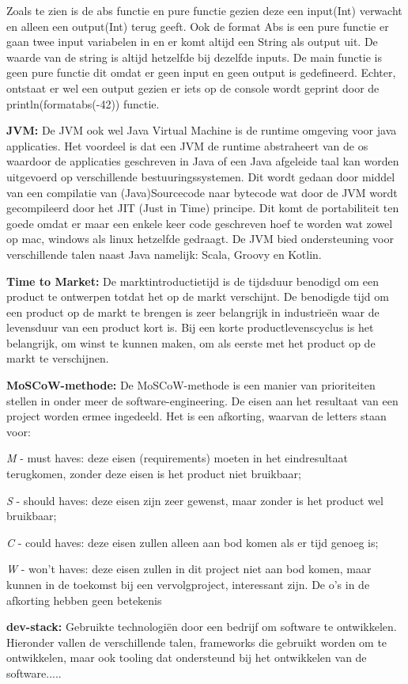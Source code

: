 Zoals te zien is de abs functie en pure functie gezien deze een input(Int) verwacht en alleen een output(Int) terug geeft.
Ook de format Abs is een pure functie er gaan twee input variabelen in en er komt altijd een String als output uit.
De waarde van de string is altijd hetzelfde bij dezelfde inputs.
De main functie is geen pure functie dit omdat er geen input en geen output is gedefineerd.
Echter, ontstaat er wel een output gezien er iets op de console wordt geprint door de println(formatabs(-42)) functie.
\smallskip

\textbf{JVM: }
De JVM ook wel Java Virtual Machine is de runtime omgeving voor java applicaties.
Het voordeel is dat een JVM de runtime abstraheert van de os waardoor de applicaties geschreven in Java of een Java afgeleide taal kan worden uitgevoerd op verschillende bestuuringssystemen.
Dit wordt gedaan door middel van een compilatie van (Java)Sourcecode naar bytecode wat door de JVM wordt gecompileerd door het JIT (Just in Time) principe.
Dit komt de portabiliteit ten goede omdat er maar een enkele keer code geschreven hoef te worden wat zowel op mac, windows als linux hetzelfde gedraagt.
De JVM bied ondersteuning voor verschillende talen naast Java namelijk: Scala, Groovy en Kotlin.
\smallskip

\textbf{Time to Market: }
De marktintroductietijd is de tijdsduur benodigd om een product te ontwerpen totdat het op de markt verschijnt.
De benodigde tijd om een product op de markt te brengen is zeer belangrijk in industrieën waar de levensduur van een product kort is.
Bij een korte productlevenscyclus is het belangrijk, om winst te kunnen maken, om als eerste met het product op de markt te verschijnen.
\smallskip

\textbf{MoSCoW-methode: }
De MoSCoW-methode is een manier van prioriteiten stellen in onder meer de software-engineering.
De eisen aan het resultaat van een project worden ermee ingedeeld.
Het is een afkorting, waarvan de letters staan voor:

\textit{M} - must haves: deze eisen (requirements) moeten in het eindresultaat terugkomen, zonder deze eisen is het product niet bruikbaar;

\textit{S} - should haves: deze eisen zijn zeer gewenst, maar zonder is het product wel bruikbaar;

\textit{C} - could haves: deze eisen zullen alleen aan bod komen als er tijd genoeg is;

\textit{W} - won't haves: deze eisen zullen in dit project niet aan bod komen, maar kunnen in de toekomst bij een vervolgproject, interessant zijn.
De o's in de afkorting hebben geen betekenis
\smallskip

\textbf{dev-stack: }
Gebruikte technologiën door een bedrijf om software te ontwikkelen.
Hieronder vallen de verschillende talen, frameworks die gebruikt worden om te ontwikkelen, maar ook tooling dat ondersteund bij het ontwikkelen van de software.....
